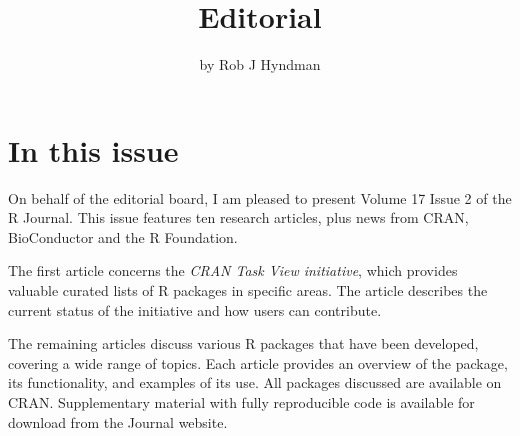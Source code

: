 \title{Editorial}


\author{by Rob J Hyndman}

\maketitle


\section*{In this issue}\label{in-this-issue}

On behalf of the editorial board, I am pleased to present Volume 17 Issue 2 of the R Journal. This issue features ten research articles, plus news from CRAN, BioConductor and the R Foundation.

The first article concerns the \emph{CRAN Task View initiative}, which provides valuable curated lists of R packages in specific areas. The article describes the current status of the initiative and how users can contribute.

The remaining articles discuss various R packages that have been developed, covering a wide range of topics. Each article provides an overview of the package, its functionality, and examples of its use. All packages discussed are available on CRAN. Supplementary material with fully reproducible code is available for download from the Journal website.


\address{%
Rob J Hyndman\\
Monash University\\%
\\
%
\url{https://journal.r-project.org}\\%
%
\href{mailto:r-journal@r-project.org}{\nolinkurl{r-journal@r-project.org}}%
}
